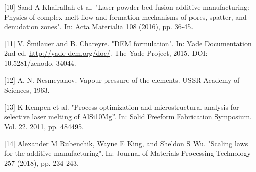 \documentclass[10pt]{article}
\begin{document}
[10] Saad A Khairallah et al. "Laser powder-bed fusion additive manufacturing: Physics of complex melt flow and formation mechanisms of pores, spatter, and denudation zones". In: Acta Materialia 108 (2016), pp. 36-45.

[11] V. Šmilauer and B. Chareyre. "DEM formulation". In: Yade Documentation 2nd ed. \href{http://yade-dem.org/doc/}{http://yade-dem.org/doc/}. The Yade Project, 2015. DOI: 10.5281/zenodo. 34044.

[12] A. N. Nesmeyanov. Vapour pressure of the elements. USSR Academy of Sciences, 1963.

[13] K Kempen et al. "Process optimization and microstructural analysis for selective laser melting of AlSi10Mg”. In: Solid Freeform Fabrication Symposium. Vol. 22. 2011, pp. 484495.

[14] Alexander M Rubenchik, Wayne E King, and Sheldon S Wu. "Scaling laws for the additive manufacturing". In: Journal of Materials Processing Technology 257 (2018), pp. 234-243.
\end{document}
